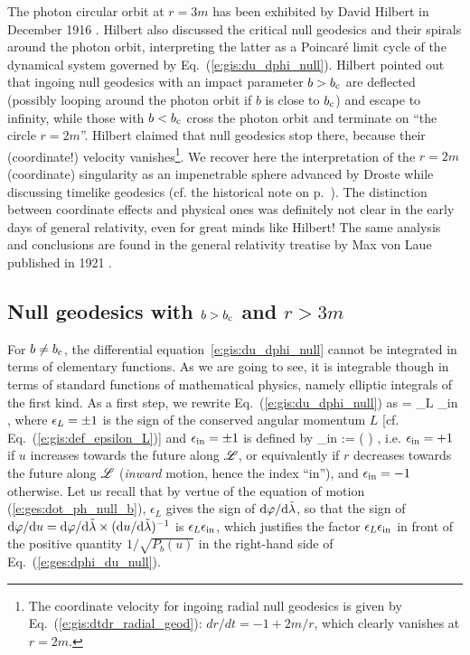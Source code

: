 \begin{hist}
The photon circular orbit at $r=3m$ has been exhibited by David Hilbert
in December 1916 \cite{Hilbe1917a,Hilbe1917b}. Hilbert also discussed the
critical null geodesics and their spirals
around the photon orbit, interpreting the latter as a Poincaré limit cycle
of the dynamical system governed by Eq.~(\ref{e:gis:du_dphi_null}).
Hilbert pointed out that ingoing null geodesics with an impact parameter
$b > b_{\rm c}$ are deflected (possibly looping
around the photon orbit if $b$ is close to $b_{\rm c}$) and escape to infinity,
while those with $b < b_{\rm c}$ cross the photon orbit and terminate on ``the circle
$r=2m$''. Hilbert claimed that null geodesics stop there, because
their (coordinate!) velocity vanishes\footnote{The coordinate velocity for
ingoing radial null geodesics is given by Eq.~(\ref{e:gis:dtdr_radial_geod}):
$dr/dt = - 1 + 2m/r$, which clearly vanishes at $r=2m$.}. We recover here the interpretation
of the $r=2m$ (coordinate) singularity as an impenetrable sphere advanced by Droste while discussing
timelike geodesics (cf. the historical note on p.~\pageref{h:ges:geod}). The distinction
between coordinate effects and physical ones was definitely not clear in the early
days of general relativity, even for great minds like Hilbert!
The same analysis and conclusions are found in the general relativity treatise
by Max von Laue published in 1921 \cite{Laue1921}.
\end{hist}

\subsection{Null geodesics with $b > b_{\rm c}$ and $r> 3m$} \label{s:gis:geod_b_gt_bc_out}

For $b \not= b_{\rm c}$, the differential equation~\eqref{e:gis:du_dphi_null} cannot be integrated
in terms of elementary functions. As we are going to see, it is integrable
though in terms of standard
functions of mathematical physics, namely elliptic integrals of the first kind.
As a first step, we rewrite Eq.~(\ref{e:gis:du_dphi_null}) as
\be \label{e:ges:dphi_du_null}
    = \eps_L \eps_{\rm in}   ,
\ee
where $\epsilon_L = \pm 1$ is the sign of the conserved angular momentum $L$
[cf. Eq.~(\ref{e:gis:def_epsilon_L})] and $\epsilon_{\rm in} = \pm 1$ is
defined by
\be
    \eps_{\rm in} :=  \left(  \right) ,
\ee
i.e. $\epsilon_{\rm in} = +1$ if $u$ increases towards the future along $\mathscr{L}$, or equivalently
if $r$ decreases towards the future along $\mathscr{L}$ (\emph{inward} motion, hence the index ``in''),
and $\epsilon_{\rm in} = -1$ otherwise.
Let us recall that by vertue of the equation of motion (\ref{e:ges:dot_ph_null_b}),
$\epsilon_L$ gives the sign of $\mathrm{d}\varphi/\mathrm{d}{\tilde\lambda}$, so that the sign of
$\mathrm{d}\varphi/\mathrm{d} u = \mathrm{d}\varphi/\mathrm{d}{\tilde\lambda} \times (\mathrm{d} u/\mathrm{d}{\tilde\lambda})^{-1}$ is $\epsilon_L \epsilon_{\rm in}$,
which justifies the factor $\epsilon_L \epsilon_{\rm in}$ in front of the positive
quantity $1/\sqrt{P_b(u)}$ in the right-hand side of Eq.~(\ref{e:ges:dphi_du_null}).

